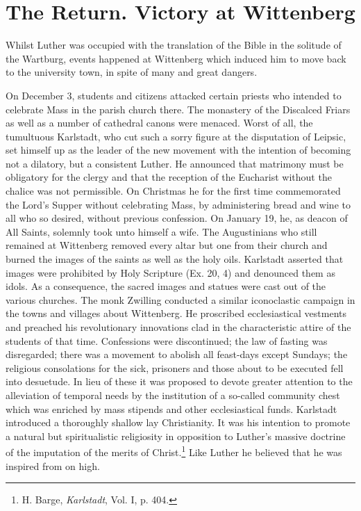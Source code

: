 \section{The Return. Victory at Wittenberg}

Whilst Luther was occupied with the translation of the Bible in
the solitude of the Wartburg, events happened at Wittenberg which
induced him to move back to the university town, in spite of many
and great dangers.

On December 3, students and citizens attacked certain priests who
intended to celebrate Mass in the parish church there. The monastery
of the Discalced Friars as well as a number of cathedral canons were
menaced. Worst of all, the tumultuous Karlstadt, who cut such a sorry
figure at the disputation of Leipsic, set himself up as the leader of the
new movement with the intention of becoming not a dilatory, but a
consistent Luther. He announced that matrimony must be obligatory
for the clergy and that the reception of the Eucharist without the
chalice was not permissible. On Christmas he for the first time commemorated
the Lord’s Supper without celebrating Mass, by administering
bread and wine to all who so desired, without previous confession. On January
19, he, as deacon of All Saints, solemnly took unto
himself a wife. The Augustinians who still remained at Wittenberg
removed every altar but one from their church and burned the images
of the saints as well as the holy oils. Karlstadt asserted that images
were prohibited by Holy Scripture (Ex. 20, 4) and denounced them
as idols. As a consequence, the sacred images and statues were cast
out of the various churches. The monk Zwilling conducted a similar
iconoclastic campaign in the towns and villages about Wittenberg.
He proscribed ecclesiastical vestments and preached his revolutionary
innovations clad in the characteristic attire of the students of that
time. Confessions were discontinued; the law of fasting was disregarded;
there was a movement to abolish all feast-days except Sundays; the religious
consolations for the sick, prisoners and those about
to be executed fell into desuetude. In lieu of these it was proposed to
devote greater attention to the alleviation of temporal needs by the institution
of a so-called community chest which was enriched by mass
stipends and other ecclesiastical funds. Karlstadt introduced a thoroughly
shallow lay Christianity. It was his intention to promote a natural but
spiritualistic religiosity in opposition to Luther’s massive
doctrine of the imputation of the merits of Christ.\footnote
{H. Barge, \textit{Karlstadt}, Vol. I, p. 404.}
Like Luther he believed that he was inspired from on high.

